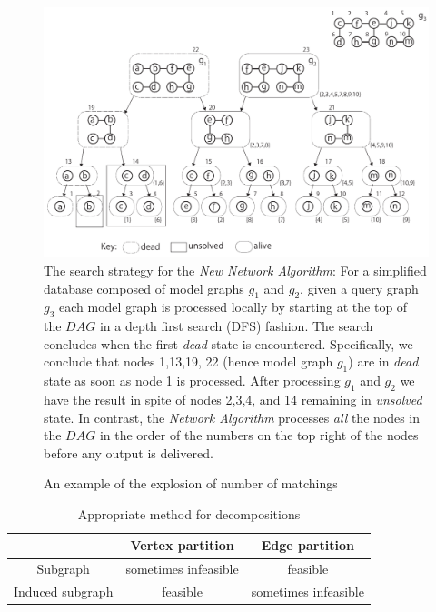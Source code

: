 \begin{figure}
\centering
\includegraphics[width=1.0\textwidth]{dag_search_optimize.pdf}
\caption{The search strategy for the \textit{New Network Algorithm}: For a simplified database composed of model graphs $g_1$ and $g_2$, given a query graph $g_3$ each model graph is processed locally by starting at the top of the $DAG$ in a depth first search (DFS) fashion. 
The search concludes when the first \textit{dead} state is encountered. 
Specifically, we conclude that nodes 1,13,19, 22 (hence model graph $g_1$) are in \textit{dead} state as soon as node 1 is processed. 
After processing $g_1$ and $g_2$ we have the result in spite of nodes 2,3,4, and 14 remaining in \textit{unsolved} state. 
In contrast, the \textit{Network Algorithm} processes \textit{all} the nodes in the $DAG$ in the order of the numbers on the top right of the nodes before any output is delivered.}
\label{fig:fig3}
\end{figure}

\begin{figure}
        \centering
        
        \caption{An example of the explosion of number of matchings \label{fig:fig4} }
\end{figure}

\begin{table}
\begin{center}\begin{tabular}{|c|c|c|}
\hline
  & Vertex partition  & Edge partition  \\ \hline
Subgraph & sometimes infeasible  & feasible \\ \hline
Induced subgraph & feasible & sometimes  infeasible \\ \hline
\end{tabular}
\caption{Appropriate method for decompositions \label{tab:table1} }
\end{center}
\end{table}

